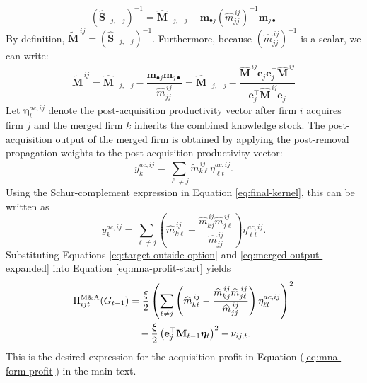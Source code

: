 \[
(\widehat{\mathbf{S}}_{-j,-j})^{-1} = \widehat{\mathbf{M}}_{-j,-j} - \mathbf{m}_{\bullet j} (\widehat{m}_{jj}^{\,ij})^{-1} \mathbf{m}_{j \bullet} 
\]
By definition, $\widetilde{\mathbf{M}}^{\,ij} = (\widehat{\mathbf{S}}_{-j,-j})^{-1}$. Furthermore, because $(\widehat{m}_{jj}^{\,ij})^{-1}$ is a scalar, we can write:
\begin{equation}
\widetilde{\mathbf{M}}^{\,ij} = \widehat{\mathbf{M}}_{-j,-j} - \frac{\mathbf{m}_{\bullet j} \mathbf{m}_{j \bullet}}{\widehat{m}_{jj}^{\,ij}}
=
\widehat{\mathbf{M}}_{-j,-j}
-
\frac{
\widehat{\mathbf{M}}^{\,ij}\mathbf{e}_j\mathbf{e}_j^\top
\widehat{\mathbf{M}}^{\,ij}
}{
\mathbf{e}_j^\top\widehat{\mathbf{M}}^{\,ij}\mathbf{e}_j
}
\label{eq:final-kernel}
\end{equation}
Let $\bm{\eta}_t^{ac,ij}$ denote the post-acquisition productivity vector after firm
$i$ acquires firm $j$ and the merged firm $k$ inherits the combined knowledge stock.
The post-acquisition output of the merged firm is obtained by applying the
post-removal propagation weights to the post-acquisition productivity vector:
\begin{equation}
y_k^{ac,ij}
=
\sum_{\ell\neq j}
\widetilde{m}_{k\ell}^{\,ij}\eta_{\ell t}^{ac,ij}.
\label{eq:merged-output-weight}
\end{equation}
Using the Schur-complement expression in Equation
\eqref{eq:final-kernel}, this can be written as
\begin{equation}
y_k^{ac,ij}
=
\sum_{\ell\neq j}
\left(
\widehat m_{k\ell}^{\,ij}
-
\frac{
\widehat m_{kj}^{\,ij}\widehat m_{j\ell}^{\,ij}
}{
\widehat m_{jj}^{\,ij}
}
\right)
\eta_{\ell t}^{ac,ij}.
\label{eq:merged-output-expanded}
\end{equation}
Substituting Equations \eqref{eq:target-outside-option} and
\eqref{eq:merged-output-expanded} into Equation \eqref{eq:mna-profit-start} yields
\begin{align*}
\Pi_{ijt}^{\text{M\&A}}(G_{t-1})
&=
\frac{\xi}{2}
\left(
\sum_{\ell\neq j}
\left(
\widehat m_{k\ell}^{\,ij}
-
\frac{
\widehat m_{kj}^{\,ij}\widehat m_{j\ell}^{\,ij}
}{
\widehat m_{jj}^{\,ij}
}
\right)
\eta_{\ell t}^{ac,ij}
\right)^2
\notag\\
&\quad-
\frac{\xi}{2}
\left(
\mathbf{e}_j^\top\mathbf{M}_{t-1}\bm{\eta}_t
\right)^2
-
\nu_{ij,t}.
\end{align*}
This is the desired expression for the acquisition profit in Equation (\ref{eq:mna-form-profit}) in the main text. 

